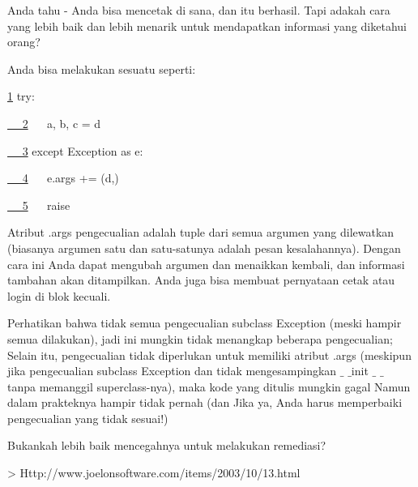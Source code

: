 \documentclass[a4paper,12pt]{report}
\begin{document}
\noindent 
\vspace{12pt}
\noindent 
Anda tahu - Anda bisa mencetak di sana, dan itu berhasil. Tapi adakah cara yang lebih baik dan lebih menarik untuk mendapatkan informasi yang diketahui orang? \par
\noindent 
\vspace{12pt}
\noindent 
Anda bisa melakukan sesuatu seperti: \par
\vspace{20pt}
\noindent 
\href{https://wiki.python.org/moin/HandlingExceptions}{1}
 try: \par
\noindent 
\href{https://wiki.python.org/moin/HandlingExceptions}{~~ 2}
~~ a, b, c = d \par
\noindent 
\href{https://wiki.python.org/moin/HandlingExceptions}{~~ 3}
 except Exception as e: \par
\noindent 
\href{https://wiki.python.org/moin/HandlingExceptions}{~~ 4}
~~ e.args += (d,) \par
\noindent 
\href{https://wiki.python.org/moin/HandlingExceptions}{~~ 5}
~~ raise \par
\vspace{20pt}
\noindent 
Atribut .args pengecualian adalah tuple dari semua argumen yang dilewatkan (biasanya argumen satu dan satu-satunya adalah pesan kesalahannya). Dengan cara ini Anda dapat mengubah argumen dan menaikkan kembali, dan informasi tambahan akan ditampilkan. Anda juga bisa membuat pernyataan cetak atau login di blok kecuali. \par
\noindent 
\vspace{12pt}
\noindent 
Perhatikan bahwa tidak semua pengecualian subclass Exception (meski hampir semua dilakukan), jadi ini mungkin tidak menangkap beberapa pengecualian; Selain itu, pengecualian tidak diperlukan untuk memiliki atribut .args (meskipun jika pengecualian subclass Exception dan tidak mengesampingkan  $  \_  $ $  \_  $init $  \_  $ $  \_  $ tanpa memanggil superclass-nya), maka kode yang ditulis mungkin gagal Namun dalam prakteknya hampir tidak pernah (dan Jika ya, Anda harus memperbaiki pengecualian yang tidak sesuai!) \par
\noindent 
\vspace{12pt}
\noindent 
Bukankah lebih baik mencegahnya untuk melakukan remediasi? \par
\noindent 
\vspace{12pt}
\noindent 
> Http://www.joelonsoftware.com/items/2003/10/13.html \par
\noindent 
\vspace{12pt}
\end{document}
